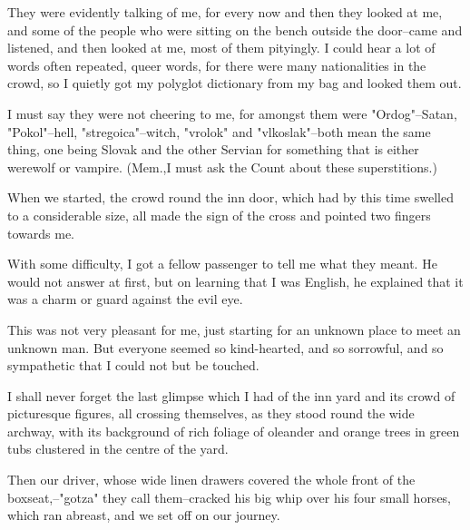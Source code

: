 They were evidently talking of me, for every now and then they looked at me, and some of the people who were sitting on the bench outside the door--came and listened, and then looked at me, most of them pityingly. I could hear a lot of words often repeated, queer words, for there were many nationalities in the crowd, so I quietly got my polyglot dictionary from my bag and looked them out. 

I must say they were not cheering to me, for amongst them were "Ordog"--Satan, "Pokol"--hell, "stregoica"--witch, "vrolok" and "vlkoslak"--both mean the same thing, one being Slovak and the other Servian for something that is either werewolf or vampire. (Mem.,I must ask the Count about these superstitions.) 

When we started, the crowd round the inn door, which had by this time swelled to a considerable size, all made the sign of the cross and pointed two fingers towards me. 

With some difficulty, I got a fellow passenger to tell me what they meant. He would not answer at first, but on learning that I was English, he explained that it was a charm or guard against the evil eye. 

This was not very pleasant for me, just starting for an unknown place to meet an unknown man. But everyone seemed so kind-hearted, and so sorrowful, and so sympathetic that I could not but be touched. 

I shall never forget the last glimpse which I had of the inn yard and its crowd of picturesque figures, all crossing themselves, as they stood round the wide archway, with its background of rich foliage of oleander and orange trees in green tubs clustered in the centre of the yard. 

Then our driver, whose wide linen drawers covered the whole front of the boxseat,--"gotza" they call them--cracked his big whip over his four small horses, which ran abreast, and we set off on our journey. 

